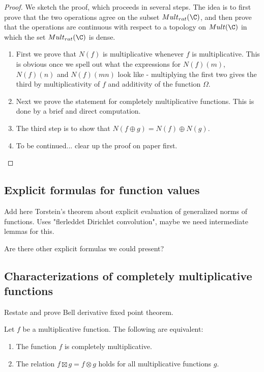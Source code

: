 \documentclass[a4paper]{article}
\begin{document}
\begin{proof}
We sketch the proof, which proceeds in several steps. The idea is to first prove that the two operations agree on the subset $Mult_{rat}(\C)$, and then prove that the operations are continuous with respect to a topology on $Mult(\C)$ in which the set $Mult_{rat}(\C)$ is dense. 


\begin{enumerate}
\item First we prove that $N(f)$ is multiplicative whenever $f$ is multiplicative. This is obvious once we spell out what the expressions for $N(f)(m)$, $N(f)(n)$ and $N(f)(mn)$ look like - multiplying the first two gives the third by multiplicativity of $f$ and additivity of the function $\Omega$.
\item Next we prove the statement for completely multiplicative functions. This is done by a brief and direct computation.
\item The third step is to show that $N(f \oplus g) = N(f) \oplus N(g)$.
\item To be continued... clear up the proof on paper first.


\end{enumerate}

\end{proof}


\subsection{Explicit formulas for function values}

\begin{theorem}
Add here Torstein's theorem about explicit evaluation of generalized norms of functions. Uses "flerleddet Dirichlet convolution", maybe we need intermediate lemmas for this.
\end{theorem}

Are there other explicit formulas we could present?

\subsection{Characterizations of completely multiplicative functions}


\begin{proposition}
Restate and prove Bell derivative fixed point theorem.
\end{proposition}

\begin{proposition}
Let $f$ be a multiplicative function. The following are equivalent:
\begin{enumerate}
\item The function $f$ is completely multiplicative.
\item The relation $f \boxtimes g = f \otimes g$ holds for all multiplicative functions $g$. 
\end{enumerate}
\end{proposition}
\end{document}
